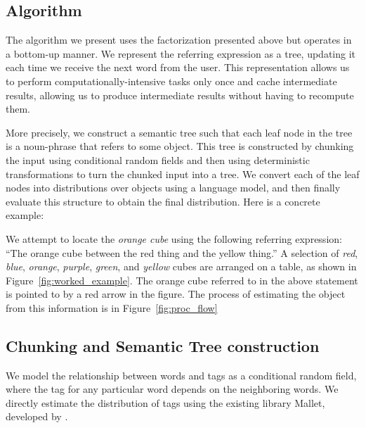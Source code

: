 \documentclass[conference]{IEEEtran}
\numberwithin{equation}{section}
\begin{document}
\subsection{Algorithm}

The algorithm we present uses the factorization presented above but operates in a bottom-up manner. We represent the referring expression as a tree, updating it each time we receive the next word from the user. This representation allows us to perform computationally-intensive tasks only once and cache intermediate results, allowing us to produce intermediate results without having to recompute them.

More precisely, we construct a semantic tree such that each leaf node in the tree is a noun-phrase that refers to some object. This tree is constructed by chunking the input using conditional random fields and then using deterministic transformations to turn the chunked input into a tree. We convert each of the leaf nodes into distributions over objects using a language model, and then finally evaluate this structure to obtain the final distribution. Here is a concrete example: 

We attempt to locate the \textit{orange cube} using the following referring expression: ``The orange cube between the red thing and the yellow thing.'' A selection of \textit{red}, \textit{blue}, \textit{orange}, \textit{purple}, \textit{green}, and  \textit{yellow} cubes are arranged on a table, as shown in Figure~\ref{fig:worked_example}. The orange cube referred to in the above statement is pointed to by a red arrow in the figure. The process of estimating the object from this information is in Figure~\ref{fig:proc_flow}


\subsection{Chunking and Semantic Tree construction}
\label{sec:tagging}

We model the relationship between words and tags as a conditional random field, where the tag for any particular word depends on the neighboring words. We directly estimate the distribution of tags using the existing library Mallet, developed by \citet{McCallumMALLET}.
\end{document}
